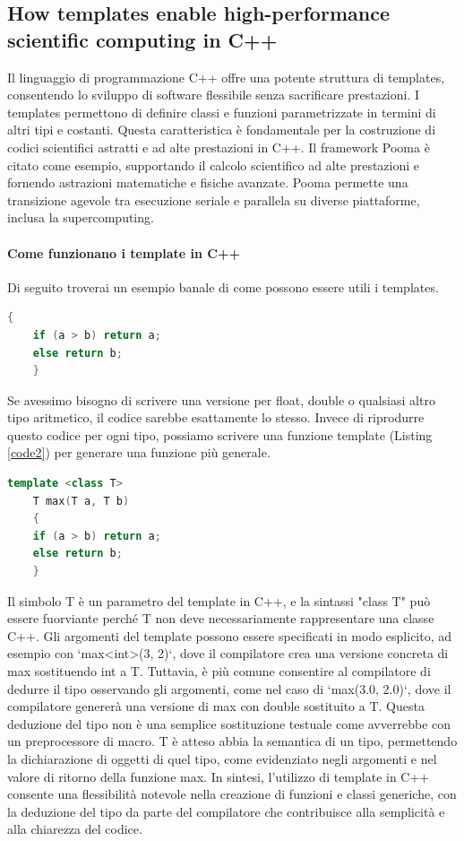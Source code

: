 \documentclass[11pt]{article}
\begin{document}
\begin{multicols*}{2}[\columnsep=1cm]
\section{How templates enable high-performance scientific computing in C++}
    Il linguaggio di programmazione C++ offre una potente struttura di templates, consentendo lo sviluppo di software flessibile senza sacrificare prestazioni. I templates permettono di definire classi e funzioni parametrizzate in termini di altri tipi e costanti. Questa caratteristica è fondamentale per la costruzione di codici scientifici astratti e ad alte prestazioni in C++. Il framework Pooma è citato come esempio, supportando il calcolo scientifico ad alte prestazioni e fornendo astrazioni matematiche e fisiche avanzate. 
    Pooma permette una transizione agevole tra esecuzione seriale e parallela su diverse piattaforme, inclusa la supercomputing.
    \paragraph{Come funzionano i template in C++}
    Di seguito troverai un esempio banale di come possono essere utili i templates.
    \begin{lstlisting}[language=C++, label=code1, caption={Max function without template}]
    {
    if (a > b) return a;
    else return b;
    }
    \end{lstlisting}
    Se avessimo bisogno di scrivere una versione per float, double o qualsiasi altro tipo aritmetico, il codice sarebbe esattamente lo stesso. Invece di riprodurre questo codice per ogni tipo, possiamo scrivere una funzione template (Listing \ref{code2}) per generare una funzione più generale.
    
    \begin{lstlisting}[language=C++, label=code2, caption={Max function with template}]
    template <class T>
    T max(T a, T b)
    {
    if (a > b) return a;
    else return b;
    }
    \end{lstlisting}
    
    Il simbolo T è un parametro del template in C++, e la sintassi "class T" può essere fuorviante perché T non deve necessariamente rappresentare una classe C++. Gli argomenti del template possono essere specificati in modo esplicito, ad esempio con `max<int>(3, 2)`, dove il compilatore crea una versione concreta di max sostituendo int a T. Tuttavia, è più comune consentire al compilatore di dedurre il tipo osservando gli argomenti, come nel caso di `max(3.0, 2.0)`, dove il compilatore genererà una versione di max con double sostituito a T.
    Questa deduzione del tipo non è una semplice sostituzione testuale come avverrebbe con un preprocessore di macro. T è atteso abbia la semantica di un tipo, permettendo la dichiarazione di oggetti di quel tipo, come evidenziato negli argomenti e nel valore di ritorno della funzione max. In sintesi, l'utilizzo di template in C++ consente una flessibilità notevole nella creazione di funzioni e classi generiche, con la deduzione del tipo da parte del compilatore che contribuisce alla semplicità e alla chiarezza del codice.


\end{multicols*}
\end{document}
